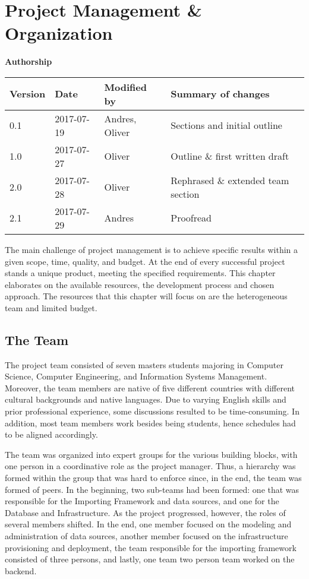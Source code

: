 \section{Project Management \& Organization}\label{sec:organization}

\textbf{Authorship}

\begin{longtable}[]{@{}llll@{}}
\toprule
Version & Date & Modified by & Summary of changes\tabularnewline
\midrule
\endhead
0.1 & 2017-07-19 & Andres, Oliver & Sections and initial
outline\tabularnewline
1.0 & 2017-07-27 & Oliver & Outline \& first written
draft\tabularnewline
2.0 & 2017-07-28 & Oliver & Rephrased \& extended team
section\tabularnewline
2.1 & 2017-07-29 & Andres & Proofread\tabularnewline
\bottomrule
\end{longtable}

The main challenge of project management is to achieve specific results
within a given scope, time, quality, and budget. At the end of every
successful project stands a unique product, meeting the specified
requirements. This chapter elaborates on the available resources, the
development process and chosen approach. The resources that this chapter
will focus on are the heterogeneous team and limited budget.

\subsection{The Team}\label{the-team}

The project team consisted of seven masters students majoring in
Computer Science, Computer Engineering, and Information Systems
Management. Moreover, the team members are native of five different
countries with different cultural backgrounds and native languages. Due
to varying English skills and prior professional experience, some discussions
resulted to be time-consuming. In addition, most team members work besides
being students, hence schedules had to be aligned accordingly.

The team was organized into expert groups for the various building
blocks, with one person in a coordinative role as the project manager.
Thus, a hierarchy was formed within the group that was hard to enforce
since, in the end, the team was formed of peers. In the beginning, two
sub-teams had been formed: one that was responsible for the Importing
Framework and data sources, and one for the Database and Infrastructure.
As the project progressed, however, the roles of several members shifted. In
the end, one member focused on the modeling and administration of data
sources, another member focused on the infrastructure provisioning and
deployment, the team responsible for the importing framework consisted
of three persons, and lastly, one team two person team worked on the
backend.

